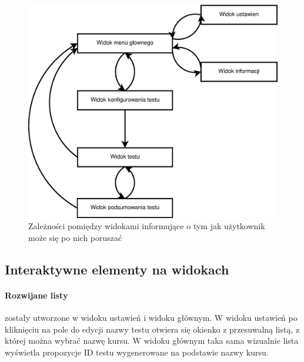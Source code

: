 \documentclass[eng]{mgr}
\begin{document}
			\begin{center}
				\begin{figure}[ht]
					\centering
					\includegraphics[scale=0.5]{diagram_zaleznosci_miedzy_widokami.eps}
					\caption{Zależności pomiędzy widokami informujące o tym jak użytkownik może się po nich poruszać}
				\end{figure}
			\end{center}
		
			\subsection{Interaktywne elementy na widokach}
		
				\paragraph{Rozwijane listy}
				zostały utworzone w widoku ustawień i widoku głównym. W widoku ustawień po kliknięciu na pole do edycji nazwy testu otwiera się okienko z przesuwalną listą, z której można wybrać nazwę kursu. W widoku głównym taka sama wizualnie lista wyświetla propozycje ID testu wygenerowane na podstawie nazwy kursu.
		
\end{document}
